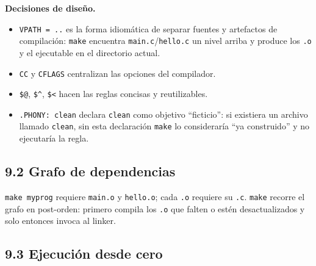 \documentclass[11pt,a4paper]{article}
\begin{document}
\textbf{Decisiones de diseño.}
\begin{itemize}[leftmargin=*]
    \item \texttt{VPATH = ..} es la forma idiomática de separar
        fuentes y artefactos de compilación: \texttt{make} encuentra
        \texttt{main.c}/\texttt{hello.c} un nivel arriba y produce
        los \texttt{.o} y el ejecutable en el directorio actual.
    \item \texttt{CC} y \texttt{CFLAGS} centralizan las opciones del
        compilador.
    \item \texttt{\$@}, \texttt{\$\^{}}, \texttt{\$<} hacen las reglas
        concisas y reutilizables.
    \item \texttt{.PHONY: clean} declara \texttt{clean} como objetivo
        ``ficticio'': si existiera un archivo llamado \texttt{clean},
        sin esta declaración \texttt{make} lo consideraría ``ya
        construido'' y no ejecutaría la regla.
\end{itemize}

\subsection*{9.2 Grafo de dependencias}

\begin{center}
\end{center}

\texttt{make myprog} requiere \texttt{main.o} y \texttt{hello.o};
cada \texttt{.o} requiere su \texttt{.c}. \texttt{make} recorre el
grafo en post-orden: primero compila los \texttt{.o} que falten o
estén desactualizados y solo entonces invoca al linker.

\subsection*{9.3 Ejecución desde cero}
\end{document}
